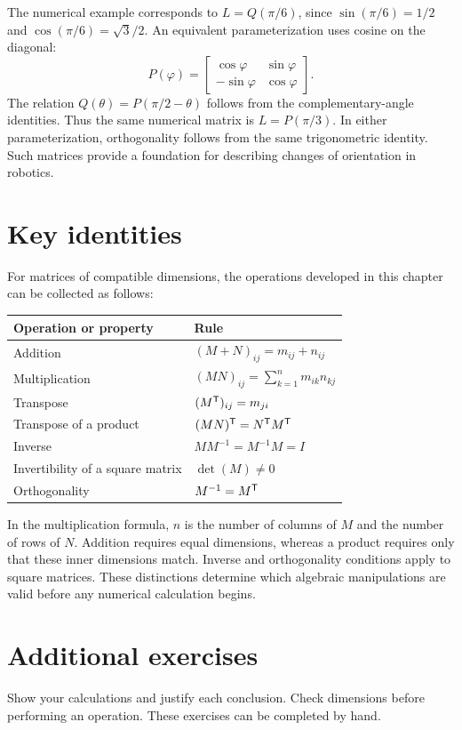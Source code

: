 The numerical example corresponds to $L=Q(\pi/6)$, since
$\sin(\pi/6)=1/2$ and $\cos(\pi/6)=\sqrt3/2$. An equivalent
parameterization uses cosine on the diagonal:
\[
 P(\varphi)=\begin{bmatrix}
 \cos\varphi&\sin\varphi\\
 -\sin\varphi&\cos\varphi
 \end{bmatrix}.
\]
The relation $Q(\theta)=P(\pi/2-\theta)$ follows from the complementary-angle
identities. Thus the same numerical matrix is $L=P(\pi/3)$. In either
parameterization, orthogonality follows from the same trigonometric identity.
Such matrices provide a foundation for describing changes of orientation
in robotics.
\section{Key identities}
For matrices of compatible dimensions, the operations developed in this
chapter can be collected as follows:
\begin{center}
\begin{tabular}{ll}
\toprule
Operation or property & Rule \\
\midrule
Addition & $(M+N)_{ij}=m_{ij}+n_{ij}$ \\
Multiplication & $(MN)_{ij}=\sum_{k=1}^{n}m_{ik}n_{kj}$ \\
Transpose & $(M^{\mathsf T})_{ij}=m_{ji}$ \\
Transpose of a product & $(MN)^{\mathsf T}=N^{\mathsf T} M^{\mathsf T}$ \\
Inverse & $MM^{-1}=M^{-1}M=I$ \\
Invertibility of a square matrix & $\det(M)\ne0$ \\
Orthogonality & $M^{-1}=M^{\mathsf T}$ \\
\bottomrule
\end{tabular}
\end{center}
In the multiplication formula, $n$ is the number of columns of $M$ and the
number of rows of $N$. Addition requires equal dimensions, whereas a product
requires only that these inner dimensions match. Inverse and orthogonality
conditions apply to square matrices. These distinctions determine which
algebraic manipulations are valid before any numerical calculation begins.

\clearpage
\section{Additional exercises}
Show your calculations and justify each conclusion. Check dimensions before
performing an operation. These exercises can be completed by hand.

